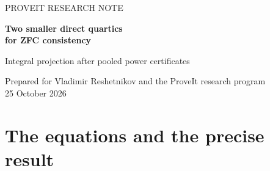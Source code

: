 \documentclass[10pt,letterpaper]{article}
\theoremstyle{definition}\newtheorem{definition}[theorem]{Definition}
\begin{document}
\begin{center}
{\sffamily\color{accent}\small PROVEIT RESEARCH NOTE\par}
\vspace{7pt}
{\LARGE\bfseries\color{ink}Two smaller direct quartics\\for ZFC consistency\par}
\vspace{7pt}
{\large Integral projection after pooled power certificates\par}
\vspace{8pt}
Prepared for Vladimir Reshetnikov and the ProveIt research program\\
25 October 2026
\end{center}
\begin{abstract}
We construct two fully materialized integer polynomials whose insolubility
is provably equivalent in ZFC to syntactic consistency of ZFC. The recommended
balanced construction is a quartic in 220 unrestricted integer variables,
with 7,793 collected monomials and coefficient height 45,161. It improves
the inspected direct 225-variable parent simultaneously in arity, number
of quadratic residuals, collected support, and coefficient height. A second
quartic has 218 integer variables, at the cost of more terms and larger
coefficients. Both equations are printed completely in the appendices and
supplied as literal sparse integer data.

The new contribution is an exact composition: five common quadratic-kernel
projections on the pooled-power system expose two further affine relations.
Integral centering and reversible row operations then improve the resulting
representations. We give explicit integer restoration maps, independent
coefficient verification, an authenticated complete parent archive, and a
finite-field certificate excluding affine consequences with affine
multipliers for the 218-variable presentation. The general projection method
is inherited from report 159; the new equations and their measured
composition are the results of this iteration. Global simplicity and
literature-wide priority are not asserted.
\end{abstract}

\section{The equations and the precise result}
\label{sec:result}
\end{document}
